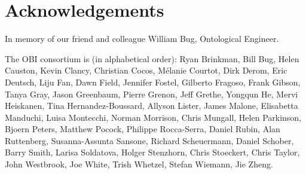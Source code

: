 \documentclass[a4paper,10pt,twocolumn]{article}
\begin{document}
\section*{Acknowledgements}

In memory of our friend and colleague William Bug, Ontological Engineer. 

The OBI consortium is (in alphabetical order): Ryan Brinkman, Bill Bug, Helen Causton, Kevin Clancy, Christian Cocos, M\'elanie Courtot, Dirk Derom, Eric Deutsch, Liju Fan, Dawn Field, Jennifer Fostel, Gilberto Fragoso, Frank Gibson, Tanya Gray, Jason Greenbaum, Pierre Grenon, Jeff Grethe, Yongqun He, Mervi Heiskanen, Tina Hernandez-Boussard, Allyson Lister, James Malone, Elisabetta Manduchi, Luisa Montecchi, Norman Morrison, Chris Mungall, Helen Parkinson, Bjoern Peters, Matthew Pocock, Philippe Rocca-Serra, Daniel Rubin, Alan Ruttenberg, Susanna-Assunta Sansone, Richard Scheuermann, Daniel Schober, Barry Smith, Larisa Soldatova, Holger Stenzhorn, Chris Stoeckert, Chris Taylor, John Westbrook,  Joe White, Trish Whetzel, Stefan Wiemann, Jie Zheng. 

   



  \balance
\end{document}
